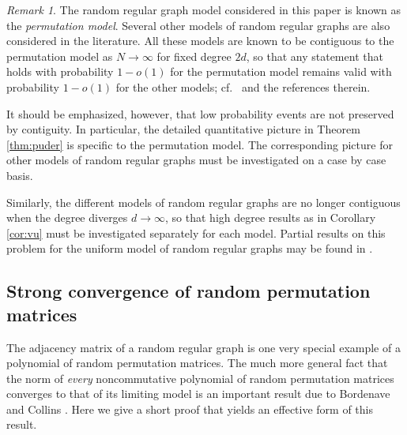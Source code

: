 \documentclass[10pt,reqno]{amsart}
\theoremstyle{definition}
\theoremstyle{remark}
\newtheorem{rem}[thm]{Remark}
\numberwithin{equation}{section}
\numberwithin{figure}{section}
\numberwithin{table}{section}
\begin{document}
\begin{rem}
\label{rem:contig}
The random regular graph model considered in this paper is known as the 
\emph{permutation model}. Several other models of random regular graphs 
are also considered in the literature. All these models are known to be 
contiguous to the permutation model as $N\to\infty$ for fixed degree $2d$, 
so that any statement that holds with probability $1-o(1)$ for the 
permutation model remains valid with probability $1-o(1)$ for the other 
models; cf.\ \cite[pp.\ 2--3]{Fri08} and the references therein.

It should be emphasized, however, that low probability events are not 
preserved by contiguity. In particular, the detailed quantitative picture 
in Theorem \ref{thm:puder} is specific to the permutation model. The 
corresponding picture for other models of random regular graphs must be 
investigated on a case by case basis.

Similarly, the different models of random regular graphs are no longer 
contiguous when the degree diverges $d\to\infty$, so that high degree 
results as in Corollary \ref{cor:vu} must be investigated separately for 
each model. Partial results on this problem for the uniform model 
of random regular graphs may be found in \cite{BHKY20,Sar23,He24}.
\end{rem}


\subsection{Strong convergence of random permutation matrices}
\label{sec:strongmain}

The adjacency matrix of a random regular graph is one very special example
of a polynomial of random permutation matrices. The much more general 
fact that the norm of \emph{every} noncommutative polynomial of random 
permutation matrices converges to that of its limiting model is an 
important result due to Bordenave and Collins \cite{BC19,BC24}. Here
we give a short proof that yields an effective form of this result.
\end{document}
